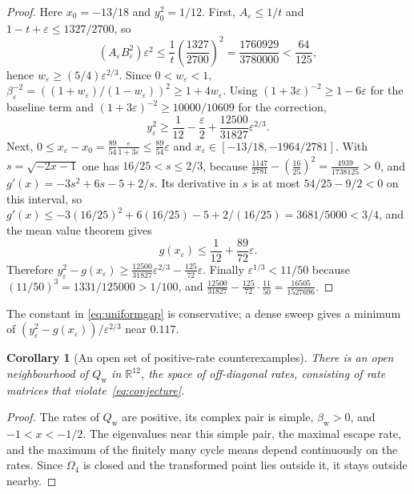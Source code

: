 \documentclass[11pt,a4paper]{article}
\numberwithin{equation}{section}
\newtheorem{corollary}[theorem]{Corollary}
\theoremstyle{definition}
\theoremstyle{remark}
\newcommand{\Om}{\Omega}
\newcommand{\eps}{\varepsilon}
\newcommand{\Qw}{Q_{\mathrm{w}}}
\newcommand{\bw}{\beta_{\mathrm{w}}}
\begin{document}
\begin{proof}
Here \(x_0=-13/18\) and \(y_0^2=1/12\). First, \(A_\eps\leq1/t\) and
\(1-t+\eps\leq1327/2700\), so
\[
(A_\eps B_\eps^2)\eps^2
\leq\frac1t\left(\frac{1327}{2700}\right)^2
=\frac{1760929}{3780000}<\frac{64}{125},
\]
hence \(w_\eps\geq(5/4)\eps^{2/3}\). Since \(0<w_\eps<1\),
\(\beta_\eps^{-2}=((1+w_\eps)/(1-w_\eps))^2\geq1+4w_\eps\). Using
\((1+3\eps)^{-2}\geq1-6\eps\) for the baseline term and
\((1+3\eps)^{-2}\geq10000/10609\) for the correction,
\begin{equation}
y_\eps^2
\geq\frac1{12}-\frac\eps2+\frac{12500}{31827}\eps^{2/3}.
\label{eq:heightlower}
\end{equation}
Next, \(0\leq x_\eps-x_0=\frac{89}{54}\frac{\eps}{1+3\eps}
\leq\frac{89}{54}\eps\) and \(x_\eps\in[-13/18,-1964/2781]\). With
\(s=\sqrt{-2x-1}\) one has \(16/25<s\leq2/3\), because
\(\frac{1147}{2781}-(\frac{16}{25})^2=\frac{4939}{1738125}>0\), and
\(g'(x)=-3s^2+6s-5+2/s\). Its derivative in \(s\) is at most
\(54/25-9/2<0\) on this interval, so
\(g'(x)\leq-3(16/25)^2+6(16/25)-5+2/(16/25)=3681/5000<3/4\), and the mean
value theorem gives
\begin{equation}
g(x_\eps)\leq\frac1{12}+\frac{89}{72}\eps.
\label{eq:boundaryupper}
\end{equation}
Therefore
\(y_\eps^2-g(x_\eps)\geq\frac{12500}{31827}\eps^{2/3}-\frac{125}{72}\eps\).
Finally \(\eps^{1/3}<11/50\) because \((11/50)^3=1331/125000>1/100\),
and \(\frac{12500}{31827}-\frac{125}{72}\cdot\frac{11}{50}
=\frac{16505}{1527696}\).
\end{proof}

The constant in \eqref{eq:uniformgap} is conservative; a dense sweep
gives a minimum of \((y_\eps^2-g(x_\eps))/\eps^{2/3}\) near \(0.117\).

\begin{corollary}[An open set of positive-rate counterexamples]
\label{cor:open}
There is an open neighbourhood of \(\Qw\) in \(\mathbb R^{12}\), the
space of off-diagonal rates, consisting of rate matrices that
violate~\eqref{eq:conjecture}.
\end{corollary}

\begin{proof}
The rates of \(\Qw\) are positive, its complex pair is simple,
\(\bw>0\), and \(-1<x<-1/2\). The eigenvalues near this simple pair,
the maximal escape rate, and the maximum of the finitely many cycle
means depend continuously on the rates. Since \(\Om_4\) is closed and
the transformed point lies outside it, it stays outside nearby.
\end{proof}
\end{document}
